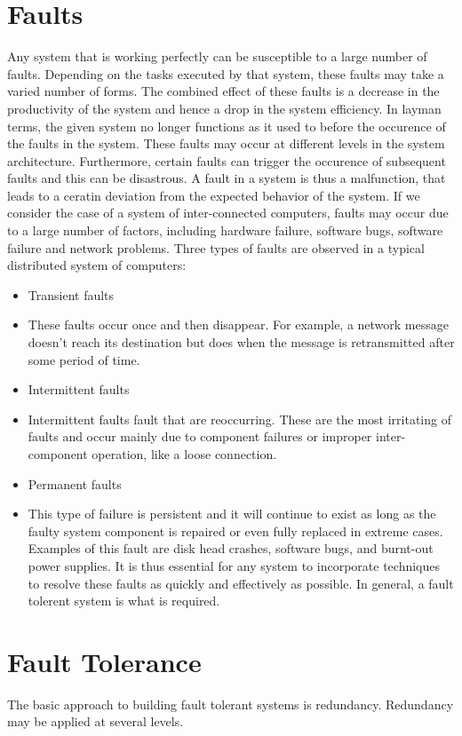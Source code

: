 \section{Faults}
Any system that is working perfectly can be susceptible to a large number of faults. Depending on the tasks executed by that system, these faults may take a varied number of forms. The combined effect of these faults is a decrease in the productivity of the system and hence a drop in the system efficiency. In layman terms, the given system no longer functions as it used to before the occurence of the faults in the system. These faults may occur at different levels in the system architecture.
Furthermore, certain faults can trigger the occurence of subsequent faults and this can be disastrous.
A fault in a system is thus a malfunction, that leads to a ceratin deviation from the expected behavior of the system. If we consider the case of a system of inter-connected computers, faults may occur due to a large number of factors, including hardware failure, software bugs, software failure and network problems. 
Three types of faults are observed in a typical distributed system of computers:
	\begin{itemize}
		\item Transient faults
		\item These faults occur once and then disappear. For example, a network message doesn't reach its destination but does when the message is retransmitted after some period of time. 
		\item Intermittent faults
		\item Intermittent faults fault that are reoccurring. These are the most irritating of faults and occur mainly due to component failures or improper inter-component operation, like a loose connection.
		\item Permanent faults
		\item This type of failure is persistent and it will continue to exist as long as the faulty system component is repaired or even fully replaced in extreme cases. Examples of this fault are disk head crashes, software bugs, and burnt-out power supplies. 
It is thus essential for any system to incorporate techniques to resolve these faults as quickly and effectively as possible. In general, a fault tolerent system is what is required.
	\end{itemize}
\section{Fault Tolerance}
The basic approach to building fault tolerant systems is redundancy. Redundancy may be applied at several levels. 
